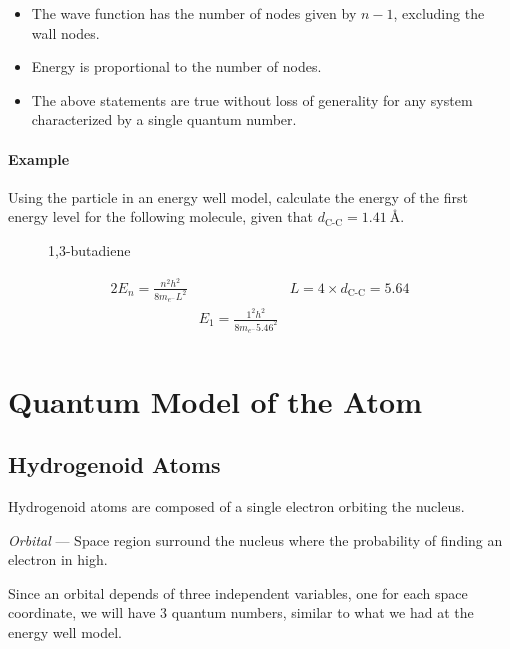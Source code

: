 \documentclass[10pt]{article}
\begin{document}
\begin{itemize}
	\item The wave function has the number of nodes given by $n-1$, excluding the wall nodes.
	\item Energy is proportional to the number of nodes.
	\item The above statements are true without loss of generality for any system characterized by a single quantum number.
\end{itemize}

\paragraph{Example}
Using the particle in an energy well model, calculate the energy of the first energy
level for the following molecule, given that $d_{\text{C-C}}=\SI{1.41}{\angstrom}$.

\begin{figure}[H]
	\centering
	{1,3-butadiene}\label{fig:butadiene}
\end{figure}
\begin{alignat*}{2}
	E_n = \frac{n^2h^2}{8m_{e^{-}}L^2} &                                       & L=4\times d_{\text{C-C}}=5.64 \\
	                                   & E_1 = \frac{1^2h^2}{8m_{e^{-}}5.46^2} &                               \\
\end{alignat*}
\clearpage
\section{Quantum Model of the Atom}
\subsection{Hydrogenoid Atoms}
Hydrogenoid atoms are composed of a single electron orbiting the nucleus.

\emph{Orbital} --- Space region surround the nucleus where the probability of
finding an electron in high.

Since an orbital depends of three independent variables, one for each space
coordinate, we will have 3 quantum numbers, similar to what we had at the energy
well model.
\end{document}
